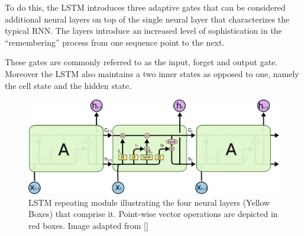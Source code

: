 \documentclass[12pt, a4paper]{report}
\theoremstyle{definition}
\theoremstyle{definition}%
\theoremstyle{definition}%
\theoremstyle{definition}%
\theoremstyle{definition}%
\theoremstyle{definition}%
\renewcommand{\cite}[1]{[\citealp{#1}]}
\begin{document}
To do this, the LSTM introduces three adaptive gates that can be considered additional neural layers on top of the single neural layer that characterizes the typical RNN. The layers introduce an increased level of sophistication in the \enquote{remembering} process from one sequence point to the next.

These gates are commonly referred to as the input, forget and output gate. Moreover the LSTM also maintains a two inner states as opposed to one, namely the cell state and the hidden state.

\begin{figure}[!ht]
    \centering
    \includegraphics[width=1\textwidth]{fyp_template/figures/lstm_architecture.png}
    \caption{LSTM repeating module illustrating the four neural layers (Yellow Boxes) that comprise it. Point-wise vector operations are depicted in red boxes. Image adapted from \cite{colah-understanding-lstm}}
    \label{fig:lstm_architecture}
\end{figure}
\end{document}

